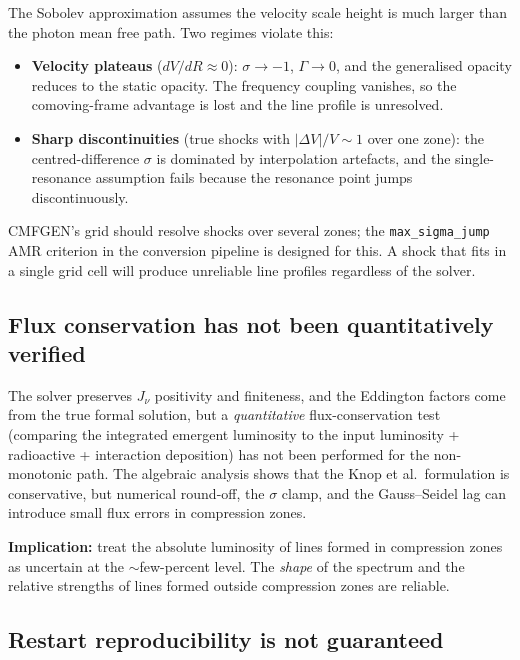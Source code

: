 \documentclass[11pt]{article}
\begin{document}
The Sobolev approximation assumes the velocity scale height is much
larger than the photon mean free path.  Two regimes violate this:
\begin{itemize}[nosep]
  \item \textbf{Velocity plateaus} ($dV/dR \approx 0$): $\sigma \to -1$,
        $\Gamma \to 0$, and the generalised opacity reduces to the
        static opacity.  The frequency coupling vanishes, so the
        comoving-frame advantage is lost and the line profile is
        unresolved.
  \item \textbf{Sharp discontinuities} (true shocks with
        $|\Delta V|/V \sim 1$ over one zone): the centred-difference
        $\sigma$ is dominated by interpolation artefacts, and the
        single-resonance assumption fails because the resonance point
        jumps discontinuously.
\end{itemize}
CMFGEN's grid should resolve shocks over several zones; the
\texttt{max\_sigma\_jump} AMR criterion in the conversion pipeline is
designed for this.  A shock that fits in a single grid cell will
produce unreliable line profiles regardless of the solver.

\subsection{Flux conservation has not been quantitatively verified}

The solver preserves $J_\nu$ positivity and finiteness, and the
Eddington factors come from the true formal solution, but a
\emph{quantitative} flux-conservation test (comparing the integrated
emergent luminosity to the input luminosity + radioactive + interaction
deposition) has not been performed for the non-monotonic path.  The
algebraic analysis shows that the Knop et al.\ formulation is
conservative, but numerical round-off, the $\sigma$ clamp, and the
Gauss--Seidel lag can introduce small flux errors in compression zones.

\textbf{Implication:} treat the absolute luminosity of lines formed in
compression zones as uncertain at the $\sim$few-percent level.  The
\emph{shape} of the spectrum and the relative strengths of lines formed
outside compression zones are reliable.

\subsection{Restart reproducibility is not guaranteed}
\end{document}
